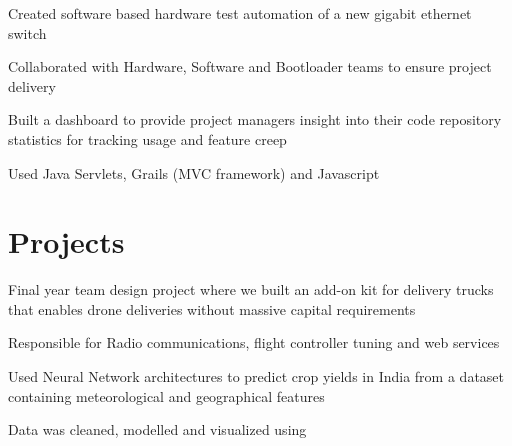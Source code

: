 \documentclass[]{deedy-resume-openfont}
\begin{document}
\begin{minipage}[t]{0.66\textwidth}
\begin{tightemize}
\item Created software based hardware test automation of a new gigabit ethernet switch
\item Collaborated with Hardware, Software and Bootloader teams to ensure
  project delivery 
\end{tightemize}
\sectionsep

\begin{tightemize}
\item Built a dashboard to provide project managers insight into their code
  repository statistics for tracking usage and feature creep 
\item Used Java Servlets, Grails (MVC framework) and Javascript 
\end{tightemize}
\sectionsep





\section{Projects}
\begin{tightemize}
\item Final year team design project where we built an add-on kit for delivery
  trucks that enables drone deliveries without massive capital requirements
\item Responsible for Radio communications, flight controller tuning and web
  services
\end{tightemize}
\sectionsep

\begin{tightemize}
\item Used Neural Network architectures to predict crop yields in India from a
  dataset containing meteorological and geographical features
\item Data was cleaned, modelled and visualized using 
\end{tightemize}
\sectionsep


\end{minipage}
\end{document}
